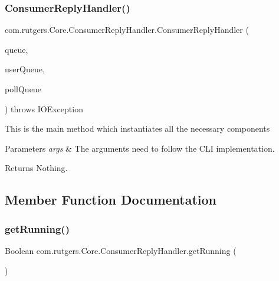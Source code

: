 \subsubsection{\texorpdfstring{Consumer\+Reply\+Handler()}{ConsumerReplyHandler()}}
{\footnotesize\ttfamily com.\+rutgers.\+Core.\+Consumer\+Reply\+Handler.\+Consumer\+Reply\+Handler (\begin{DoxyParamCaption}\item[{Blocking\+Queue$<$ \hyperlink{classcom_1_1rutgers_1_1Core_1_1Pair}{com.\+rutgers.\+Core.\+Pair}$<$ Peer\+Address, A\+R\+Message $>$$>$}]{queue,  }\item[{Blocking\+Queue$<$ A\+R\+Message $>$}]{user\+Queue,  }\item[{Blocking\+Queue$<$ A\+R\+Message $>$}]{poll\+Queue }\end{DoxyParamCaption}) throws I\+O\+Exception}

This is the main method which instantiates all the necessary components 
\begin{DoxyParams}{Parameters}
{\em args} & The arguments need to follow the C\+LI implementation. \\
\hline
\end{DoxyParams}
\begin{DoxyReturn}{Returns}
Nothing. 
\end{DoxyReturn}


\subsection{Member Function Documentation}
\mbox{\label{classcom_1_1rutgers_1_1Core_1_1ConsumerReplyHandler_a02a5478d120604f1c5b9ea578c9a5158}} 
\subsubsection{\texorpdfstring{get\+Running()}{getRunning()}}
{\footnotesize\ttfamily Boolean com.\+rutgers.\+Core.\+Consumer\+Reply\+Handler.\+get\+Running (\begin{DoxyParamCaption}{ }\end{DoxyParamCaption})}

